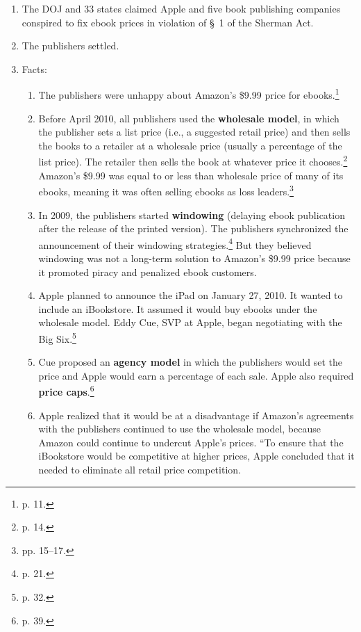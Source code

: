 \begin{enumerate}
    \item The DOJ and 33 states claimed Apple and five book publishing companies 
    conspired to fix ebook prices in violation of \S\ 1 of the Sherman Act.
    \item The publishers settled.
    \item Facts:
    \begin{enumerate}
        \item The publishers were unhappy about Amazon's \$9.99 price for 
        ebooks.\footnote{p. 11.}
        \item Before April 2010, all publishers used the \textbf{wholesale  
        model}, in which the publisher sets a list price (i.e., a suggested 
        retail price) and then sells the books to a retailer at a wholesale 
        price (usually a percentage of the list price). The retailer then sells 
        the book at whatever price it chooses.\footnote{p. 14.} Amazon's \$9.99 
        was equal to or less than wholesale price of many of its ebooks, meaning 
        it was often selling ebooks as loss leaders.\footnote{pp. 15--17.}
        \item In 2009, the publishers started \textbf{windowing} (delaying ebook 
        publication after the release of the printed version). The publishers 
        synchronized the announcement of their windowing strategies.\footnote{p.  
        21.} But they believed windowing was not a long-term solution to 
        Amazon's \$9.99 price because it promoted piracy and penalized ebook 
        customers.
        \item Apple planned to announce the iPad on January 27, 2010. It wanted 
        to include an iBookstore. It assumed it would buy ebooks under the 
        wholesale model. Eddy Cue, SVP at Apple, began negotiating with the Big 
        Six.\footnote{p. 32.}
        \item Cue proposed an \textbf{agency model} in which the publishers 
        would set the price and Apple would earn a percentage of each sale.  
        Apple also required \textbf{price caps}.\footnote{p. 39.}
        \item Apple realized that it would be at a disadvantage if Amazon's 
        agreements with the publishers continued to use the wholesale model, 
        because Amazon could continue to undercut Apple's prices.  ``To ensure 
        that the iBookstore would be competitive at higher prices, Apple 
        concluded that it needed to eliminate all retail price competition.  

\end{enumerate}
\end{enumerate}
